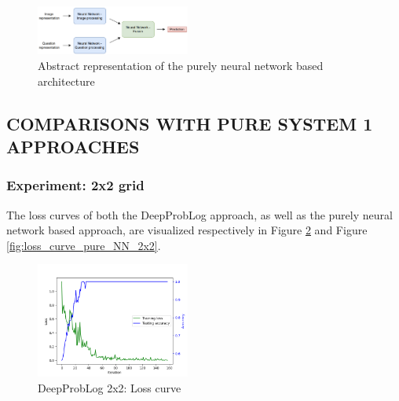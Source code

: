\documentclass[english]{sobraep}
\begin{document}
\begin{figure}[htp]
    \begin{center}
    \includegraphics[width=0.45\textwidth]{pure_nn_architecture.png} 
    \captionsetup{justification=centering}
    \caption{Abstract representation of the purely neural network based architecture \cite{model_architecture}}
    \label{fig:pure_nn_network}
    \end{center}
\end{figure}

\subsection{COMPARISONS WITH PURE SYSTEM 1 APPROACHES}
\label{subsec:experiments_NN_vs_deepproblog}
\subsubsection{Experiment: 2x2 grid}
The loss curves of both the DeepProbLog approach, as well as the purely neural network based approach, are visualized respectively in Figure \ref{fig:loss_curve_deepproblog_2x2} and Figure \ref{fig:loss_curve_pure_NN_2x2}.

\begin{figure}[htp]
    \begin{center}
    \includegraphics[width=0.45\textwidth]{loss_curve_deepproblog_2x2.png} 
    \captionsetup{justification=centering}
    \caption{DeepProbLog 2x2: Loss curve}
    \label{fig:loss_curve_deepproblog_2x2}
    \end{center}
\end{figure}
\end{document}
